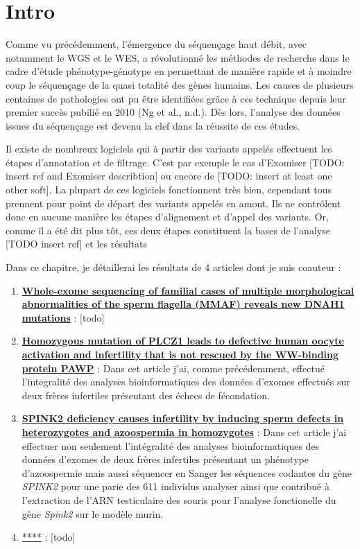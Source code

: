 \documentclass[12pt,twoside]{reedthesis}
\providecommand{\tightlist}{%
  \setlength{\itemsep}{0pt}\setlength{\parskip}{0pt}}
\theoremstyle{definition}
\theoremstyle{definition}
\theoremstyle{remark}
\begin{document}
  \section{Intro}\label{intro}
  
  Comme vu précédemment, l'émergence du séquençage haut débit, avec
  notamment le WGS et le WES, a révolutionné les méthodes de recherche
  dans le cadre d'étude phénotype-génotype en permettant de manière rapide
  et à moindre coup le séquençage de la quasi totalité des gènes humains.
  Les causes de plusieurs centaines de pathologies ont pu être identifiées
  grâce à ces technique depuis leur premier succès pubilié en 2010 (Ng et
  al., n.d.). Dès lors, l'analyse des données issues du séquençage est
  devenu la clef dans la réussite de ces études.
  
  Il existe de nombreux logiciels qui à partir des variants appelés
  effectuent les étapes d'annotation et de filtrage. C'est par exemple le
  cas d'Exomiser {[}TODO: insert ref and Exomiser describtion{]} ou encore
  de {[}TODO: insert at least one other soft{]}. La plupart de ces
  logiciels fonctionnent très bien, cependant tous prennent pour point de
  départ des variants appelés en amont. Ils ne contrôlent donc en aucune
  manière les étapes d'alignement et d'appel des variants. Or, comme il a
  été dit plus tôt, ces deux étapes constituent la bases de l'analyse
  {[}TODO insert ref{]} et les résultats
  
  Dans ce chapitre, je détaillerai les résultats de 4 articles dont je
  suis coauteur :
  
  \begin{enumerate}
  \def\labelenumi{\arabic{enumi}.}
  \tightlist
  \item
    \protect\hyperlink{famdnah1}{\textbf{Whole-exome sequencing of
    familial cases of multiple morphological abnormalities of the sperm
    flagella (MMAF) reveals new DNAH1 mutations}} : {[}todo{]}
  \item
    \protect\hyperlink{plcz}{\textbf{Homozygous mutation of PLCZ1 leads to
    defective human oocyte activation and infertility that is not rescued
    by the WW-binding protein PAWP}} : Dans cet article j'ai, comme
    précédemment, effectué l'integralité des analyses bioinformatiques des
    données d'exomes effectués sur deux frères infertiles présentant des
    échecs de fécondation.\\
  \item
    \protect\hyperlink{spink2}{\textbf{SPINK2 deficiency causes
    infertility by inducing sperm defects in heterozygotes and azoospermia
    in homozygotes}} : Dans cet article j'ai effectuer non seulement
    l'intégralité des analyses bioinformatiques des données d'exomes de
    deux frères infertiles présentant un phénotype d'azoospermie mais
    aussi séquencer en Sanger les séquences codantes du gène \emph{SPINK2}
    pour une parie des 611 individus analyser ainsi que contribué à
    l'extraction de l'ARN testiculaire des souris pour l'analyse
    fonctionelle du gène \emph{Spink2} sur le modèle murin.\\
  \item
    \protect\hyperlink{cohortemmah}{****} : {[}todo{]}
  \end{enumerate}
  
\end{document}
